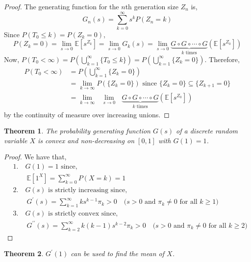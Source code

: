 \documentclass{tufte-handout}
\newtheorem{thm}{Theorem}
\begin{document}
\begin{proof}
  The generating function for the $n$th generation size $Z_n$ is,
  \[G_{n}(s)=\sum_{k=0}^{\infty} s^{k} P\left(Z_{n}=k\right)\]
  Since $P(T_0 \leq k) = P(Z_k = 0)$,
  \[P(Z_k = 0) = \lim_{s \rightarrow 0} \mathbb{E}[s^{Z_k}] = \lim_{s \rightarrow 0} G_k(s) = \lim_{s \rightarrow 0} \underbrace{G \circ G \circ \cdots \circ G}_{k \text{ times}}(\mathbb{E}[s^{Z_{0}}])\]
  Now, $P(T_0 < \infty) = P(\bigcup_{k=1}^{\infty} \{T_0 \leq k\}) = P(\bigcup_{k=1}^{\infty} \{Z_k = 0\})$. Therefore,
  \begin{align*}
    P(T_0 < \infty) &= P(\bigcup_{k=1}^{\infty} \{Z_k = 0\}) \\
                    &= \lim_{k \rightarrow \infty} P(\{Z_k = 0\}) \text{ since $\{Z_{k} = 0\} \subseteq \{Z_{k+1} = 0\}$}\\
                    &= \lim_{k \rightarrow \infty} \text{ } \lim_{s \rightarrow 0} \text{ } \underbrace{G \circ G \circ \cdots \circ G}_{k \text{ times}}(\mathbb{E}[s^{Z_{0}}])
  \end{align*}
  \noindent by the continuity of measure over increasing unions.
\end{proof}

\begin{thm}
  The probability generating function $G(s)$ of a discrete random variable $X$ is convex and non-decreasing on $[0,1]$ with $G(1) = 1$.
\end{thm}

\begin{proof}
    We have that,
    \begin{align*}
      &1. \quad \text{$G(1) = 1$ since,}\\
      &\quad\quad \mathbb{E}[1^X] = \sum_{k=0}^{\infty} P(X = k) = 1 \\
      &2. \quad \text{$G(s)$ is strictly increasing since,}\\
      &\quad\quad G^{\prime}(s) = \sum_{k=1}^{\infty} ks^{k-1}\pi_k > 0 \quad \text{($s > 0$ and $\pi_k \neq 0$ for all $k \geq 1$)}\\
      &3. \quad \text{$G(s)$ is strictly convex since,}\\
      &\quad\quad G^{\prime\prime}(s) = \sum_{k=2}^{\infty} k(k-1)s^{k-2}\pi_k > 0 \quad \text{($s > 0$ and $\pi_k \neq 0$ for all $k \geq 2$)}
    \end{align*}
\end{proof}

\begin{thm}
  $G^{\prime}(1)$ can be used to find the mean of $X$.
\end{thm}
\end{document}
